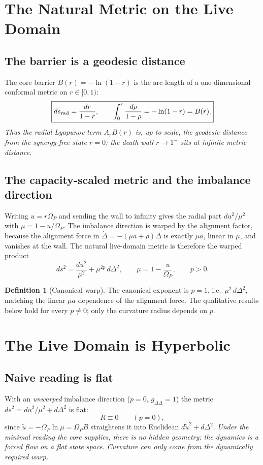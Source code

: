 \documentclass[11pt,a4paper]{article}
\newcommand{\Op}{\Omega_P}
\newcommand{\note}[1]{\textcolor{black!65}{\emph{#1}}}
\theoremstyle{plain}
\theoremstyle{remark}
\theoremstyle{definition}
\newtheorem{definition}{Definition}
\begin{document}
\section{The Natural Metric on the Live Domain}

\subsection*{The barrier is a geodesic distance}
The core barrier $B(r)=-\ln(1-r)$ is the arc length of a one-dimensional conformal metric on
$r\in[0,1)$:
\[
\boxed{ds_{\rm rad}=\frac{dr}{1-r},\qquad
\int_0^r\frac{d\rho}{1-\rho}=-\ln(1-r)=B(r).}
\]
\note{Thus the radial Lyapunov term $A_rB(r)$ is, up to scale, the geodesic distance from the
synergy-free state $r=0$; the death wall $r\to1^-$ sits at infinite metric distance.}

\subsection*{The capacity-scaled metric and the imbalance direction}
Writing $u=r\Op$ and sending the wall to infinity gives the radial part $du^2/\mu^2$ with
$\mu=1-u/\Op$. The imbalance direction is warped by the alignment factor, because the alignment
force in $\dot\Delta=-(\mu a+\rho)\Delta$ is exactly $\mu a$, linear in $\mu$, and vanishes at the
wall. The natural live-domain metric is therefore the warped product
\[
\boxed{ds^2=\frac{du^2}{\mu^2}+\mu^{2p}\,d\Delta^2,
\qquad \mu=1-\frac{u}{\Op},\qquad p>0.}
\]
\begin{definition}[Canonical warp]
The canonical exponent is $p=1$, i.e.\ $\mu^{2}\,d\Delta^2$, matching the linear $\mu a$ dependence
of the alignment force. The qualitative results below hold for every $p\neq0$; only the curvature
radius depends on $p$.
\end{definition}

\section{The Live Domain is Hyperbolic}

\subsection*{Naive reading is flat}
With an \emph{unwarped} imbalance direction ($p=0$, $g_{\Delta\Delta}=1$) the metric
$ds^2=du^2/\mu^2+d\Delta^2$ is flat:
\[
\boxed{R\equiv0\qquad(p=0),}
\]
since $\tilde u=-\Op\ln\mu=\Op B$ straightens it into Euclidean $d\tilde u^2+d\Delta^2$.
\note{Under the minimal reading the core supplies, there is no hidden geometry: the dynamics is a
forced flow on a flat state space. Curvature can only come from the dynamically required warp.}
\end{document}
